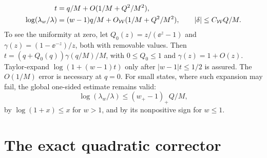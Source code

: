 \documentclass[11pt,a4paper]{article}
\theoremstyle{remark}\newtheorem{remark}[theorem]{Remark}
\numberwithin{equation}{section}
\begin{document}
\begin{align}
 t&=q/M+O(1/M+Q^2/M^2),\label{wasc:lv:eq:texpand}\\
 \log(\lambda_w/\lambda)&=(w-1)q/M+O_{\mathcal W}(1/M+Q^2/M^2),
 \qquad |\delta|\le C_{\mathcal W}Q/M.\label{wasc:lv:eq:lambdaexpand}
\end{align}
To see the uniformity at zero, let $Q_0(z)=z/(\ee^z-1)$ and
$\gamma(z)=(1-\ee^{-z})/z$, both with removable values. Then
$t=(q+Q_0(q))\gamma(q/M)/M$, with $0\le Q_0\le1$ and $\gamma(z)=1+O(z)$. Taylor-expand $\log(1+(w-1)t)$ only after $|w-1|t\le1/2$ is assured. The $O(1/M)$ error is necessary at $q=0$.
For small states, where such expansion may fail, the global one-sided estimate remains valid:
\begin{equation}\label{wasc:lv:eq:globalperturb}
\log(\lambda_w/\lambda)\le(w_+-1)_+Q/M,
\end{equation}
by $\log(1+x)\le x$ for $w>1$, and by its nonpositive sign for $w\le1$.

\section{The exact quadratic corrector}\label{wasc:lv:sec:corrector}
\end{document}
